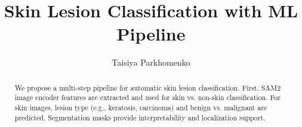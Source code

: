 \title{Skin Lesion Classification with ML Pipeline}

\subtitle{}


\repdate{\today}


%
\author[IVC]{Taisiya Parkhomenko}

%
\newcommand{\TUGn}{Graz University of Technology}
\address[IVC]{Institute of Visual Computing \\ \TUGn, Austria}


%

\begin{abstract}

We propose a multi-step pipeline for automatic skin lesion classification. First, SAM2 image encoder features are extracted and used for skin vs. non-skin classification. For skin images, lesion type (e.g., keratosis, carcinoma) and benign vs. malignant are predicted. Segmentation masks provide interpretability and localization support.

\end{abstract}



